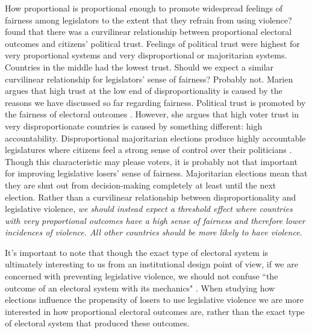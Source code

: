 \documentclass[a4paper]{article}\usepackage{graphicx, color}
\begin{document}
How proportional is proportional enough to promote widespread feelings of fairness among legislators to the extent that they refrain from using violence? \cite{Marien2011} found that there was a curvilinear relationship between proportional electoral outcomes and citizens' political trust. Feelings of political trust were highest for very proportional systems and very disproportional or majoritarian systems. Countries in the middle had the lowest trust. Should we expect a similar curvilinear relationship for legislators' sense of fairness? Probably not. Marien argues that high trust at the low end of disproportionality is caused by the reasons we have discussed so far regarding fairness. Political trust is promoted by the fairness of electoral outcomes \citep{lijphart1999}. However, she argues that high voter trust in very disproportionate countries is caused by something different: high accountability. Disproportional majoritarian elections produce highly accountable legislatures where citizens feel a strong sense of control over their politicians \citep{Aarts2008,CHO2012}. Though this characteristic may please voters, it is probably not that important for improving legislative losers' sense of fairness. Majoritarian elections mean that they are shut out from decision-making completely at least until the next election. Rather than a curvilinear relationship between disproportionality and legislative violence, \emph{we should instead expect a threshold effect where countries with very proportional outcomes have a high sense of fairness and therefore lower incidences of violence. All other countries should be more likely to have violence.} 

It's important to note that though the exact type of electoral system is ultimately interesting to us from an institutional design point of view, if we are concerned with preventing legislative violence, we should not confuse ``the outcome of an electoral system with its mechanics" \citep[][109]{Golder2005}. When studying how elections influence the propensity of losers to use legislative violence we are more interested in how proportional electoral outcomes are, rather than the exact type of electoral system that produced these outcomes. 
\end{document}
